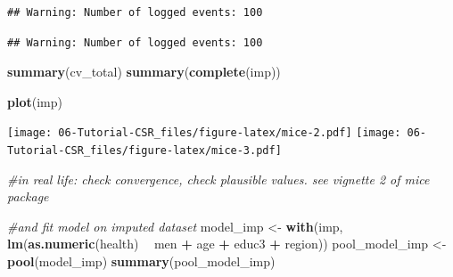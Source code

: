 \documentclass[
]{book}
\newenvironment{Shaded}{\begin{snugshade}}{\end{snugshade}}
\newcommand{\CommentTok}[1]{\textcolor[rgb]{0.56,0.35,0.01}{\textit{#1}}}
\newcommand{\DataTypeTok}[1]{\textcolor[rgb]{0.13,0.29,0.53}{#1}}
\newcommand{\DecValTok}[1]{\textcolor[rgb]{0.00,0.00,0.81}{#1}}
\newcommand{\KeywordTok}[1]{\textcolor[rgb]{0.13,0.29,0.53}{\textbf{#1}}}
\newcommand{\NormalTok}[1]{#1}
\newcommand{\OperatorTok}[1]{\textcolor[rgb]{0.81,0.36,0.00}{\textbf{#1}}}
\newcommand{\StringTok}[1]{\textcolor[rgb]{0.31,0.60,0.02}{#1}}
\begin{document}
\begin{verbatim}
## Warning: Number of logged events: 100
\end{verbatim}

\begin{Shaded}
\end{Shaded}

\begin{verbatim}
## Warning: Number of logged events: 100
\end{verbatim}

\begin{Shaded}
\begin{Highlighting}[numbers=left,,]
\KeywordTok{summary}\NormalTok{(cv_total)}
\KeywordTok{summary}\NormalTok{(}\KeywordTok{complete}\NormalTok{(imp))}

\KeywordTok{plot}\NormalTok{(imp)}
\end{Highlighting}
\end{Shaded}

\texttt{[image: 06-Tutorial-CSR\_files/figure-latex/mice-2.pdf]} \texttt{[image: 06-Tutorial-CSR\_files/figure-latex/mice-3.pdf]}

\begin{Shaded}
\begin{Highlighting}[numbers=left,,]
\CommentTok{#in real life: check convergence, check plausible values. see vignette 2 of mice package}

\CommentTok{#and fit model on imputed dataset}
\NormalTok{model_imp <-}\StringTok{ }\KeywordTok{with}\NormalTok{(imp, }\KeywordTok{lm}\NormalTok{(}\KeywordTok{as.numeric}\NormalTok{(health) }\OperatorTok{~}\StringTok{ }\NormalTok{men }\OperatorTok{+}\StringTok{ }\NormalTok{age }\OperatorTok{+}\StringTok{ }\NormalTok{educ3 }\OperatorTok{+}\StringTok{ }\NormalTok{region))}
\NormalTok{pool_model_imp <-}\StringTok{ }\KeywordTok{pool}\NormalTok{(model_imp)}
\KeywordTok{summary}\NormalTok{(pool_model_imp)}
\end{Highlighting}
\end{Shaded}
\end{document}

